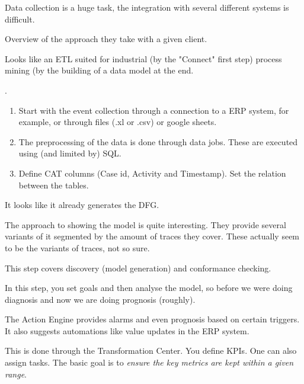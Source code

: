 
\nextslides[slide=7]

Data collection is a huge task, the integration with several different systems is difficult.

\nextslides

Overview of the approach they take with a given client.

\nextslides


\nextslides[slide=11]

Looks like an ETL suited for industrial (by the "Connect" first step) process mining (by the building of a data model at the end.

\nextslides


\nextslides

.

\begin{enumerate}
    \item Start with the event collection through a connection to a ERP system, for example, or through files (.xl or .csv) or google sheets.
    \item The preprocessing of the data is done through data jobs. These are executed using (and limited by) SQL.
    \item Define CAT columns (Case id, Activity and Timestamp). Set the relation between the tables.
\end{enumerate}

\nextslides[until=15] 

It looks like it already generates the DFG.

The approach to showing the model is quite interesting. They provide several variants of it segmented by the amount of traces they cover. These actually seem to be the variants of traces, not so sure.

This step covers discovery (model generation) and conformance checking.

\nextslides[until=17] 

In this step, you set goals and then analyse the model, so before we were doing diagnosis and now we are doing prognosis (roughly).

The Action Engine provides alarms and even prognosis based on certain triggers. It also suggests automations like value updates in the ERP system.

\nextslides[until=19] 

This is done through the Transformation Center. You define KPIs. One can also assign tasks. The basic goal is to \emph{ensure the key metrics are kept within a given range}.


